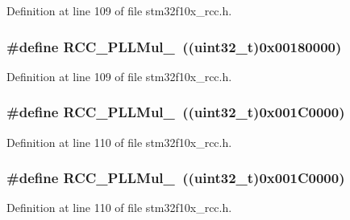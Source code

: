 Definition at line 109 of file stm32f10x\+\_\+rcc.\+h.

\subsubsection[{\texorpdfstring{R\+C\+C\+\_\+\+P\+L\+L\+Mul\+\_\+8}{RCC_PLLMul_8}}]{\setlength{\rightskip}{0pt plus 5cm}\#define R\+C\+C\+\_\+\+P\+L\+L\+Mul\+\_~(({\bf uint32\+\_\+t})0x00180000)}\hypertarget{group___p_l_l__multiplication__factor_ga8c1f1c5fe591f062078acf603bfbfb06}{}\label{group___p_l_l__multiplication__factor_ga8c1f1c5fe591f062078acf603bfbfb06}


Definition at line 109 of file stm32f10x\+\_\+rcc.\+h.

\subsubsection[{\texorpdfstring{R\+C\+C\+\_\+\+P\+L\+L\+Mul\+\_\+9}{RCC_PLLMul_9}}]{\setlength{\rightskip}{0pt plus 5cm}\#define R\+C\+C\+\_\+\+P\+L\+L\+Mul\+\_~(({\bf uint32\+\_\+t})0x001\+C0000)}\hypertarget{group___p_l_l__multiplication__factor_ga984bc5a117e3c6066e2fc7b29a0affda}{}\label{group___p_l_l__multiplication__factor_ga984bc5a117e3c6066e2fc7b29a0affda}


Definition at line 110 of file stm32f10x\+\_\+rcc.\+h.

\subsubsection[{\texorpdfstring{R\+C\+C\+\_\+\+P\+L\+L\+Mul\+\_\+9}{RCC_PLLMul_9}}]{\setlength{\rightskip}{0pt plus 5cm}\#define R\+C\+C\+\_\+\+P\+L\+L\+Mul\+\_~(({\bf uint32\+\_\+t})0x001\+C0000)}\hypertarget{group___p_l_l__multiplication__factor_ga984bc5a117e3c6066e2fc7b29a0affda}{}\label{group___p_l_l__multiplication__factor_ga984bc5a117e3c6066e2fc7b29a0affda}


Definition at line 110 of file stm32f10x\+\_\+rcc.\+h.

